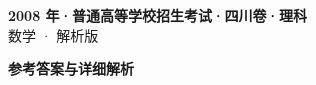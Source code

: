 \documentclass[zihao=-4, a4paper]{ctexart}
\begin{document}
\begin{center}
  {\Large\bfseries 2008 年·普通高等学校招生考试·四川卷·理科}\\[4pt]
  {\large 数学 · 解析版}
\end{center}
\medskip
{}

\clearpage
{}
\begin{center}{\Large\bfseries 参考答案与详细解析}\end{center}
\medskip

\end{document}
